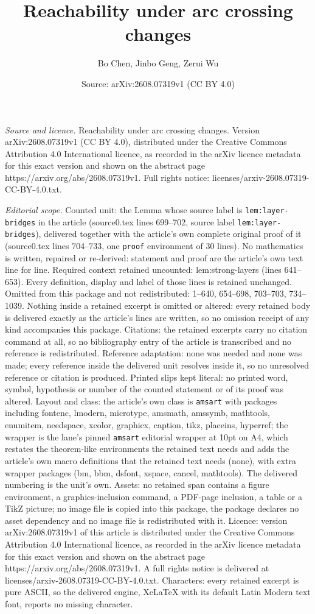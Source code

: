 \documentclass[10pt,a4paper]{amsart}
\title[Reachability under arc crossing changes]{Reachability under arc crossing changes}
\author{Bo Chen, Jinbo Geng, Zerui Wu}
\date{Source: arXiv:2608.07319v1 (CC BY 4.0)}
\begin{document}
\maketitle

\noindent\emph{Source and licence.} Reachability under arc crossing changes. Version arXiv:2608.07319v1 (CC BY 4.0), distributed under the Creative Commons Attribution 4.0 International licence, as recorded in the arXiv licence metadata for this exact version and shown on the abstract page https://arxiv.org/abs/2608.07319v1. Full rights notice: licenses/arxiv-2608.07319-CC-BY-4.0.txt.\par\smallskip

\noindent\textit{Editorial scope.} Counted unit: the Lemma whose source label is \texttt{lem:layer-bridges} in the article (source0.tex lines 699--702, source label \texttt{lem:layer-bridges}), delivered together with the article's own complete original proof of it (source0.tex lines 704--733, one \texttt{proof} environment of 30 lines). No mathematics is written, repaired or re-derived: statement and proof are the article's own text line for line. Required context retained uncounted: lem:strong-layers (lines 641--653). Every definition, display and label of those lines is retained unchanged. Omitted from this package and not redistributed: 1--640, 654--698, 703--703, 734--1039. Nothing inside a retained excerpt is omitted or altered: every retained body is delivered exactly as the article's lines are written, so no omission receipt of any kind accompanies this package. Citations: the retained excerpts carry no citation command at all, so no bibliography entry of the article is transcribed and no reference is redistributed. Reference adaptation: none was needed and none was made; every reference inside the delivered unit resolves inside it, so no unresolved reference or citation is produced. Printed slips kept literal: no printed word, symbol, hypothesis or number of the counted statement or of its proof was altered. Layout and class: the article's own class is \texttt{amsart} with packages including fontenc, lmodern, microtype, amsmath, amssymb, mathtools, enumitem, needspace, xcolor, graphicx, caption, tikz, placeins, hyperref; the wrapper is the lane's pinned \texttt{amsart} editorial wrapper at 10pt on A4, which restates the theorem-like environments the retained text needs and adds the article's own macro definitions that the retained text needs (none), with extra wrapper packages (bm, bbm, dsfont, xspace, cancel, mathtools). The delivered numbering is the unit's own. Assets: no retained span contains a figure environment, a graphics-inclusion command, a PDF-page inclusion, a table or a TikZ picture; no image file is copied into this package, the package declares no asset dependency and no image file is redistributed with it. Licence: version arXiv:2608.07319v1 of this article is distributed under the Creative Commons Attribution 4.0 International licence, as recorded in the arXiv licence metadata for this exact version and shown on the abstract page https://arxiv.org/abs/2608.07319v1. A full rights notice is delivered at licenses/arxiv-2608.07319-CC-BY-4.0.txt. Characters: every retained excerpt is pure ASCII, so the delivered engine, XeLaTeX with its default Latin Modern text font, reports no missing character.
\end{document}
